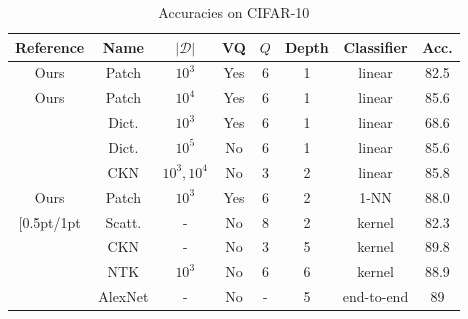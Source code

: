 \documentclass{article}
\begin{document}
{\begin{table}[h]
  \caption{Accuracies on CIFAR-10}
  \label{accuracy}
  \centering
  \begin{tabular}{|c|c|c|c|c|c|c|c|}
    \hline 
    Reference&Name&$|\mathcal{D}|$&VQ&$Q$&Depth &Classifier& Acc. \\
    \hline 
    \hline 
    Ours&Patch&$10^3$ & Yes&6&1&linear&82.5 \\
    \hdashline[0.5pt/1pt]
    Ours&Patch&$10^4$ & Yes&6&1&linear&85.6\\
    \hdashline[0.5pt/1pt]
    \cite{coates2011analysis}&Dict.&$10^3$& Yes&6 & 1&linear & 68.6\\
    \hline 
    \cite{recht2019imagenet}&Dict.&$10^5$ & No& 6&1&linear &85.6\\
    \hdashline[0.5pt/1pt]
    \cite{mairal2016end}&CKN&$10^3, 10^4$& No&3 & 2& linear &85.8\\
    \hline
        
    Ours&Patch&$10^3$ & Yes& 6&2&1-NN&88.0\\
    \hdashline[0.5pt/1pt
     \cite{Oyallon_2015_CVPR}&Scatt.& - & No& 8 &2 & kernel & 82.3\\
     
    \hdashline[0.5pt/1pt]
    \cite{shankar2020neural}&CKN&-& No&3&5&kernel &89.8\\
        \hdashline[0.5pt/1pt]
    \cite{li2019enhanced}&NTK&$10^3$& No&6&6&kernel &88.9\\
    \hdashline[0.5pt/1pt]
    \cite{krizhevsky2012imagenet}&AlexNet&-& No&-&5&end-to-end&89\\
    \hline
  \end{tabular}
\end{table}




}
\end{document}
